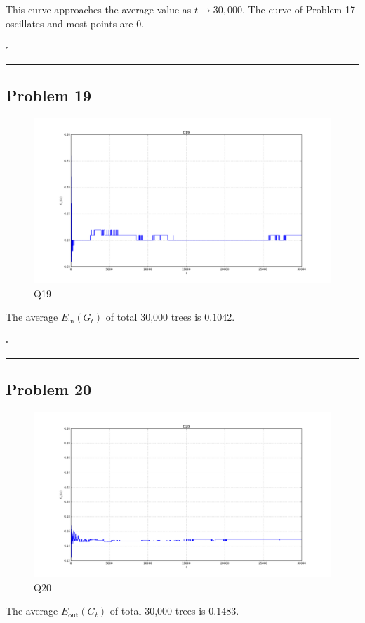 \documentclass[12pt]{article}
\newcommand*{\QEDB}{\hfill\ensuremath{\square}}
\newcommand{\ParTh}[1]{\left(#1\right)}
\newcommand{\horrule}[1]{\rule{\linewidth}{#1}}
\begin{document}
This curve approaches the average value as $t\rightarrow30,000$. The curve of Problem 17 oscillates and most points are 0.

\QEDB

\horrule{0.5pt}

\subsection*{Problem 19}

\begin{figure}[H]
	\centering
	\includegraphics[scale=0.3]{Q19.png}
	\caption{Q19}
	\label{Q19}
\end{figure}
The average $E_{\text{in}}\ParTh{G_t}$ of total 30,000 trees is $0.1042$.

\QEDB

\horrule{0.5pt}

\subsection*{Problem 20}

\begin{figure}[H]
	\centering
	\includegraphics[scale=0.3]{Q20.png}
	\caption{Q20}
	\label{Q20}
\end{figure}
The average $E_{\text{out}}\ParTh{G_t}$ of total 30,000 trees is $0.1483$.
\end{document}
